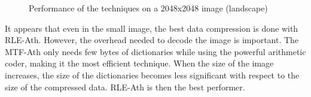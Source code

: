 \begin{figure}[h]
	\vspace*{-0.4cm}
	\centering
	\caption{Performance of the techniques on a 2048x2048 image (landscape)}
	\label{fig:big}
	\vspace*{-0.5cm}
\end{figure}

It appears that even in the small image, the best data compression is done with RLE-Ath. However, the overhead needed to decode the image is important. The MTF-Ath only needs few bytes of dictionaries while using the powerful arithmetic coder, making it the most efficient technique. When the size of the image increases, the size of the dictionaries becomes less significant with respect to the size of the compressed data. RLE-Ath is then the best performer.